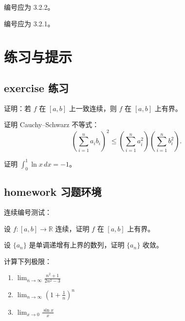 \documentclass[12pt,a4paper]{ctexbook}
\begin{document}
\begin{theorem}
编号应为 3.2.2。
\end{theorem}

\begin{definition}
编号应为 3.2.1。
\end{definition}

\chapter{练习与提示}

\section{exercise 练习}

\exerciseline

\begin{exercise}
证明：若 $f$ 在 $[a,b]$ 上一致连续，则 $f$ 在 $[a,b]$ 上有界。
\end{exercise}

\begin{exercise}
证明 Cauchy--Schwarz 不等式：
\[
  \left(\sum_{i=1}^n a_i b_i\right)^2
  \leq \left(\sum_{i=1}^n a_i^2\right)\left(\sum_{i=1}^n b_i^2\right).
\]
\end{exercise}

\begin{exercise}[(提示：用分部积分)]
证明 $\displaystyle\int_0^1 \ln x\,dx = -1$。
\end{exercise}

\section{homework 习题环境}

连续编号测试：

\begin{homework}
设 $f\colon[a,b]\to\mathbb{R}$ 连续，证明 $f$ 在 $[a,b]$ 上有界。
\end{homework}

\begin{homework}
设 $\{a_n\}$ 是单调递增有上界的数列，证明 $\{a_n\}$ 收敛。
\end{homework}

\begin{homework}
    
计算下列极限：
\begin{enumerate}
  \item $\displaystyle\lim_{n\to\infty}\frac{n^2+1}{2n^2-3}$
  \item $\displaystyle\lim_{n\to\infty}\left(1+\frac{1}{n}\right)^n$
  \item $\displaystyle\lim_{x\to 0}\frac{\sin x}{x}$
\end{enumerate}
\end{homework}
\end{document}
